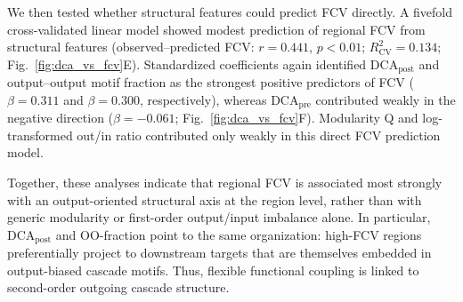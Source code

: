\documentclass[9pt,twocolumn,twoside]{pnas-new}
\begin{document}
We then tested whether structural features could predict FCV directly. A fivefold cross-validated linear model showed modest prediction of regional FCV from structural features (observed--predicted FCV: $r = 0.441$, $p < 0.01$; $R^2_{\mathrm{CV}} = 0.134$; Fig.~\ref{fig:dca_vs_fcv}E). Standardized coefficients again identified $\mathrm{DCA}_{\mathrm{post}}$ and output--output motif fraction as the strongest positive predictors of FCV ($\beta = 0.311$ and $\beta = 0.300$, respectively), whereas $\mathrm{DCA}_{\mathrm{pre}}$ contributed weakly in the negative direction ($\beta = -0.061$; Fig.~\ref{fig:dca_vs_fcv}F). Modularity Q and log-transformed out/in ratio contributed only weakly in this direct FCV prediction model.

Together, these analyses indicate that regional FCV is associated most strongly with an output-oriented structural axis at the region level, rather than with generic modularity or first-order output/input imbalance alone. In particular, $\mathrm{DCA}_{\mathrm{post}}$ and OO-fraction point to the same organization: high-FCV regions preferentially project to downstream targets that are themselves embedded in output-biased cascade motifs. Thus, flexible functional coupling is linked to second-order outgoing cascade structure.
\end{document}
